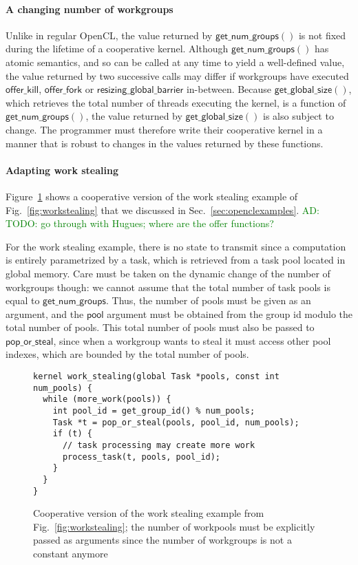 \documentclass[numbers,nocopyrightspace,10pt]{sigplanconf}
\newcommand{\ADComment}[1]{\textcolor{green}{AD: #1}}
\newcommand{\myfig}{Fig.~}
\newcommand{\myfiglong}{Figure~}
\newcommand{\mysec}{Sec.~}
\newcommand{\offerfork}{\mathsf{offer\_fork}}
\newcommand{\offerkill}{\mathsf{offer\_kill}}
\newcommand{\resizingglobalbarrier}{\mathsf{resizing\_global\_barrier}}
\newcommand{\getnumgroups}{\mathsf{get\_num\_groups}}
\newcommand{\getglobalsize}{\mathsf{get\_global\_size}}
\begin{document}
\paragraph{A changing number of workgroups}  Unlike in regular OpenCL,
the value returned by $\getnumgroups()$ is not fixed during the
lifetime of a cooperative kernel.  Although
$\getnumgroups()$ has atomic semantics, and so can be called at any
time to yield a well-defined value, the value returned by two
successive calls may differ if workgroups have executed $\offerkill$,
$\offerfork$ or $\resizingglobalbarrier$ in-between.  Because $\getglobalsize()$, which retrieves the total number of threads executing the kernel, is
a function of $\getnumgroups()$, the value returned by $\getglobalsize()$ is also subject to change.
The programmer
must therefore write their cooperative kernel in a manner that is
robust to changes in the values returned by these functions.

\paragraph{Adapting work stealing}

\myfiglong\ref{fig:workstealing-cooperative} shows a cooperative
version of the work stealing example of \myfig\ref{fig:workstealing} that we
discussed in \mysec\ref{sec:openclexamples}.
\ADComment{TODO: go through with Hugues; where are the offer functions?}

For the work stealing example, there is no state to transmit since a
computation is entirely parametrized by a task, which is retrieved from
a task pool located in global memory. Care must be taken on the dynamic
change of the number of workgroups though: we cannot assume that the
total number of task pools is equal to $\getnumgroups$. Thus, the number
of pools must be given as an argument, and the $\mathsf{pool}$ argument
must be obtained from the group id modulo the total number of
pools. This total number of pools must also be passed to
$\mathsf{pop\_or\_steal}$, since when a workgroup wants to steal it must
access other pool indexes, which are bounded by the total number of
pools.

\begin{figure}

\begin{lstlisting}
kernel work_stealing(global Task *pools, const int num_pools) {
  while (more_work(pools)) {
    int pool_id = get_group_id() % num_pools;
    Task *t = pop_or_steal(pools, pool_id, num_pools);
    if (t) {
      // task processing may create more work
      process_task(t, pools, pool_id);
    }
  }
}
\end{lstlisting}

\caption{Cooperative version of the work stealing example from \myfig\ref{fig:workstealing}; the number of workpools
must be explicitly passed as arguments since the number of workgroups
is not a constant anymore}\label{fig:workstealing-cooperative}
\end{figure}
\end{document}
